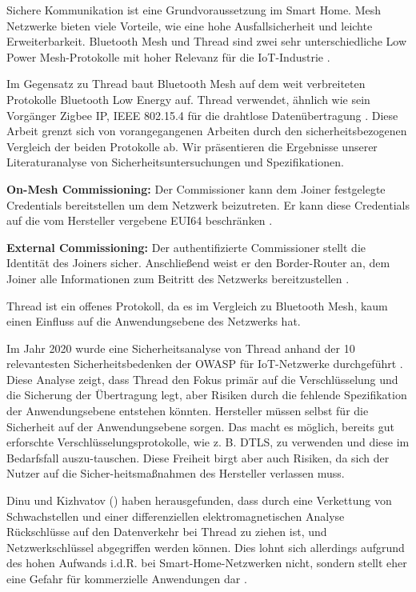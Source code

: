 \documentclass{article}
\begin{document}
Sichere Kommunikation ist eine Grundvoraussetzung im Smart Home. Mesh Netzwerke
bieten viele Vorteile, wie eine hohe Ausfallsicherheit und leichte
Erweiterbarkeit. Bluetooth Mesh und Thread sind zwei sehr unterschiedliche Low
Power Mesh-Protokolle mit hoher Relevanz für die IoT-Industrie
\parencite{ThreadMeshVsOtherWirelessIEEE, HardwareSecurity, BLEMeshEmbeddedComputingCom}.

Im Gegensatz zu Thread baut Bluetooth Mesh auf dem weit verbreiteten Protokolle
Bluetooth Low Energy auf. Thread verwendet, ähnlich wie sein Vorgänger Zigbee
IP, IEEE 802.15.4 für die drahtlose Datenübertragung \parencite{ThreadSpec, BluetoothSpec}.
Diese Arbeit grenzt sich von vorangegangenen Arbeiten durch den
sicherheitsbezogenen Vergleich der beiden Protokolle ab. Wir präsentieren die
Ergebnisse unserer Literaturanalyse von Sicherheitsuntersuchungen und
Spezifikationen.

\textbf{On-Mesh Commissioning:} Der Commissioner kann dem Joiner festgelegte
Credentials bereitstellen um dem Netzwerk beizutreten. Er kann diese
Credentials auf die vom Hersteller vergebene EUI64 beschränken
\parencite{ThreadSpec}.

\textbf{External Commissioning:} Der authentifizierte Commissioner stellt die
Identität des Joiners sicher. Anschließend weist er den Border-Router an, dem
Joiner alle Informationen zum Beitritt des Netzwerks bereitzustellen
\parencite{ThreadSpec}.

Thread ist ein offenes Protokoll, da es im Vergleich zu Bluetooth Mesh, kaum
einen Einfluss auf die Anwendungsebene des Netzwerks hat.

Im Jahr 2020 wurde eine Sicherheitsanalyse von Thread anhand der 10
relevantesten Sicherheitsbedenken der OWASP für IoT-Netzwerke durchgeführt
\parencite{ThreadSecurityCSIAC}. Diese Analyse zeigt, dass Thread den Fokus
primär auf die Verschlüsselung und die Sicherung der Übertragung legt, aber
Risiken durch die fehlende Spezifikation der Anwendungsebene entstehen
könnten. Hersteller müssen selbst für die Sicherheit auf der Anwendungsebene
sorgen. Das macht es möglich, bereits gut erforschte
Verschlüsselungsprotokolle, wie z. B. DTLS, zu verwenden und diese im
Bedarfsfall auszu-tauschen. Diese Freiheit birgt aber auch Risiken, da sich der
Nutzer auf die Sicher-heitsmaßnahmen des Hersteller verlassen muss.


Dinu und Kizhvatov (\citeyear{ThreadEMAttack}) haben herausgefunden, dass durch
eine Verkettung von Schwachstellen und einer differenziellen
elektromagnetischen Analyse Rückschlüsse auf den Datenverkehr bei Thread zu
ziehen ist, und Netzwerkschlüssel abgegriffen werden können. Dies lohnt sich
allerdings aufgrund des hohen Aufwands i.d.R. bei Smart-Home-Netzwerken nicht,
sondern stellt eher eine Gefahr für kommerzielle Anwendungen dar
\parencite{ThreadEMAttack}.
\end{document}
